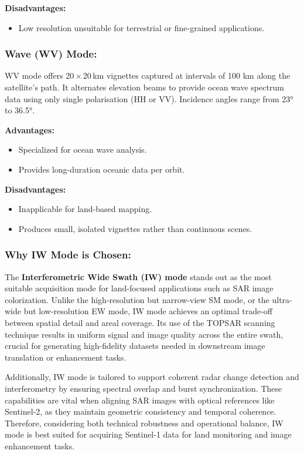 \textbf{Disadvantages:}
\begin{itemize}
    \item Low resolution unsuitable for terrestrial or fine-grained applications.
\end{itemize}

\subsubsection{\textbf{Wave (WV) Mode: }}

WV mode offers 20 × 20 km vignettes captured at intervals of 100 km along the satellite's path. It alternates elevation beams to provide ocean wave spectrum data using only single polarisation (HH or VV). Incidence angles range from 23° to 36.5°.


\textbf{Advantages:}
\begin{itemize}
    \item Specialized for ocean wave analysis.
    \item Provides long-duration oceanic data per orbit.
\end{itemize}

\textbf{Disadvantages:}
\begin{itemize}
    \item Inapplicable for land-based mapping.
    \item Produces small, isolated vignettes rather than continuous scenes.
\end{itemize}

\subsubsection{\textbf{Why IW Mode is Chosen: }}

The \textbf{Interferometric Wide Swath (IW) mode} stands out as the most suitable acquisition mode for land-focused applications such as SAR image colorization. Unlike the high-resolution but narrow-view SM mode, or the ultra-wide but low-resolution EW mode, IW mode achieves an optimal trade-off between spatial detail and areal coverage. Its use of the TOPSAR scanning technique results in uniform signal and image quality across the entire swath, crucial for generating high-fidelity datasets needed in downstream image translation or enhancement tasks.

Additionally, IW mode is tailored to support coherent radar change detection and interferometry by ensuring spectral overlap and burst synchronization. These capabilities are vital when aligning SAR images with optical references like Sentinel‑2, as they maintain geometric consistency and temporal coherence. Therefore, considering both technical robustness and operational balance, IW mode is best suited for acquiring Sentinel-1 data for land monitoring and image enhancement tasks.



